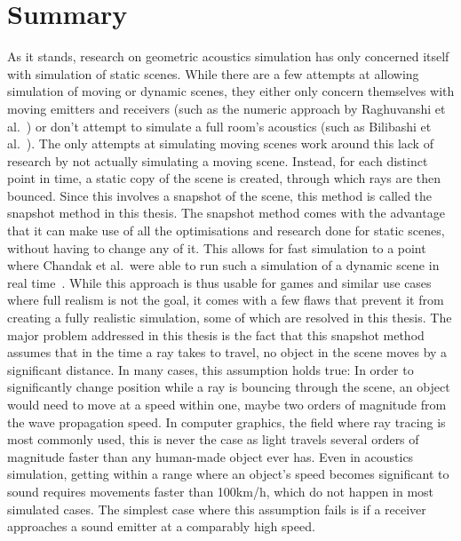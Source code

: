 \chapter{Summary}\label{ch:Summary}

As it stands, research on geometric acoustics simulation has only concerned itself with simulation of static scenes.
While there are a few attempts at allowing simulation of moving or dynamic scenes,
they either only concern themselves with moving emitters and receivers
(such as the numeric approach by Raghuvanshi et al.~\cite{RS10})
or don't attempt to simulate a full room's acoustics (such as Bilibashi et al.~\cite{BVD20}).
\newline
The only attempts at simulating moving scenes work around this lack of research by not actually simulating a moving scene.
Instead, for each distinct point in time, a static copy of the scene is created,
through which rays are then bounced.
Since this involves a snapshot of the scene, this method is called the snapshot method in this thesis.
\newline
The snapshot method comes with the advantage that it can make use of all the optimisations and research done for static scenes,
without having to change any of it.
This allows for fast simulation to a point where Chandak et al.~were able to run such a simulation of a dynamic scene in real time~\cite{Cha08}.
While this approach is thus usable for games and similar use cases where full realism is not the goal,
it comes with a few flaws that prevent it from creating a fully realistic simulation,
some of which are resolved in this thesis.
\newline
The major problem addressed in this thesis is the fact that this snapshot method assumes that in the time a ray takes to travel,
no object in the scene moves by a significant distance.
In many cases, this assumption holds true:
In order to significantly change position while a ray is bouncing through the scene,
an object would need to move at a speed within one, maybe two orders of magnitude from the wave propagation speed.
In computer graphics, the field where ray tracing is most commonly used,
this is never the case as light travels several orders of magnitude faster than any human-made object ever has.
Even in acoustics simulation, getting within a range where an object's speed becomes significant to sound
requires movements faster than 100km/h, which do not happen in most simulated cases.
\newline
The simplest case where this assumption fails is if a receiver approaches a sound emitter at a comparably high speed.

